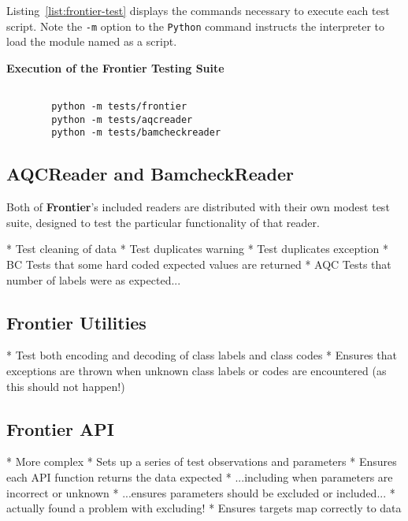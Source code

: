 Listing~\ref{list:frontier-test} displays the commands necessary to execute each
test script. Note the \texttt{-m} option to the \texttt{Python} command
instructs the interpreter to load the module named as a script.

\begin{listing}[H]
    \caption[frontier-test]{\textbf{Execution of the Frontier Testing Suite}}
    \label{list:frontier-test}
    \begin{verbatim}

        python -m tests/frontier
        python -m tests/aqcreader
        python -m tests/bamcheckreader
    \end{verbatim}
\end{listing}

\subsection{AQCReader and BamcheckReader}

Both of \textbf{Frontier}'s included readers are distributed with their own
modest test suite, designed to test the particular functionality of that reader.


* Test cleaning of data
* Test duplicates warning
* Test duplicates exception
* BC Tests that some hard coded expected values are returned
* AQC Tests that number of labels were as expected...

\subsection{Frontier Utilities}

* Test both encoding and decoding of class labels and class codes
* Ensures that exceptions are thrown when unknown class labels or codes are
encountered (as this should not happen!)

\subsection{Frontier API}
* More complex
* Sets up a series of test observations and parameters
* Ensures each API function returns the data expected
* ...including when parameters are incorrect or unknown
* ...ensures parameters should be excluded or included...
* actually found a problem with excluding!
* Ensures targets map correctly to data


